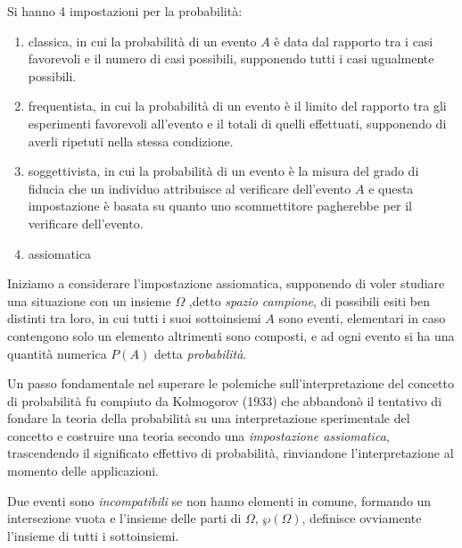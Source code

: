 \documentclass[a4paper,12pt, oneside]{book}
\begin{document}
Si hanno 4 impostazioni per la probabilità:
\begin{enumerate}
    \item classica, in cui la probabilità di un evento $A$ è data dal rapporto tra i casi favorevoli e il
          numero di casi possibili, supponendo tutti i casi ugualmente possibili.
    \item frequentista, in cui la probabilità di un evento è il limito del rapporto tra gli esperimenti
          favorevoli all'evento e il totali di quelli effettuati, supponendo di averli ripetuti nella stessa
          condizione.
    \item soggettivista, in cui la probabilità di un evento è la misura del grado di fiducia che un individuo
          attribuisce al verificare dell'evento $A$ e questa impostazione è basata su quanto uno scommettitore
          pagherebbe per il verificare dell'evento.
    \item assiomatica
\end{enumerate}
Iniziamo a considerare l'impostazione assiomatica, supponendo di voler studiare una situazione con un insieme $\Omega$
,detto \emph{spazio campione}, di possibili esiti ben distinti tra loro, in cui tutti i suoi sottoinsiemi $A$
sono eventi, elementari in caso contengono solo un elemento altrimenti sono composti,
e ad ogni evento si ha una quantità numerica $P(A)$ detta \emph{probabilità}.

Un passo fondamentale nel superare le polemiche sull'interpretazione del concetto di probabilità
fu compiuto da Kolmogorov (1933) che abbandonò il tentativo di fondare la teoria della probabilità su una 
interpretazione sperimentale del concetto e costruire una teoria secondo una \emph{impostazione assiomatica},
trascendendo il significato effettivo di probabilità, rinviandone l'interpretazione al momento delle applicazioni.

Due eventi sono \emph{incompatibili} se non hanno elementi in comune, formando un intersezione vuota
e l'insieme delle parti di $\Omega$, $\wp(\Omega)$, definisce ovviamente l'insieme di tutti i sottoinsiemi.
\end{document}
